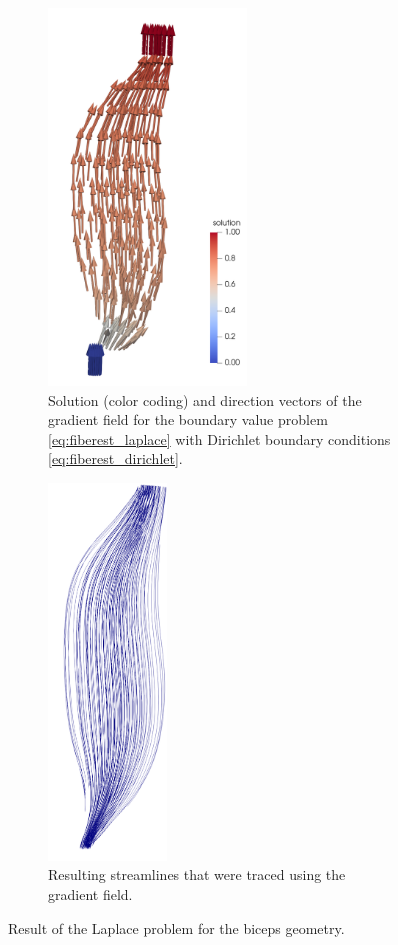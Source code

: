 \begin{figure}%
  \centering%
  \begin{subfigure}[t]{0.48\textwidth}%
    \centering%
    \includegraphics[height=10cm]{images/fiber_creation/potential_flow.png}%
    \caption{Solution (color coding) and direction vectors of the gradient field for the boundary value problem \cref{eq:fiberest_laplace} with Dirichlet boundary conditions \cref{eq:fiberest_dirichlet}.}%
    \label{fig:potential_flow}%
  \end{subfigure}
  \quad
  \begin{subfigure}[t]{0.48\textwidth}%
    \centering%
    \includegraphics[height=10cm]{images/fiber_creation/streamlines.png}%
    \caption{Resulting streamlines that were traced using the gradient field.}%
    \label{fig:fiber_tracing_streamlines}%
  \end{subfigure}
  \caption{Result of the Laplace problem for the biceps geometry.}%
  \label{fig:potential_flow_streamlines}%
\end{figure}%
%
